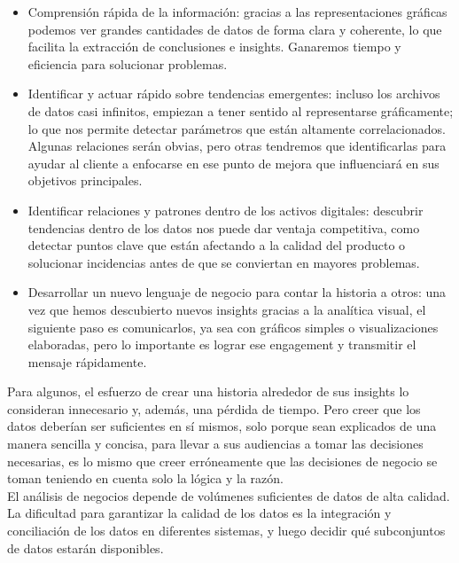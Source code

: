 \documentclass[preprint,12pt]{elsarticle}
\begin{document}
	\begin{itemize}
		\item Comprensión rápida de la información: gracias a las representaciones gráficas podemos ver grandes cantidades de datos de forma clara y coherente, lo que facilita la extracción de conclusiones e insights. Ganaremos tiempo y eficiencia para solucionar problemas.

		\item Identificar y actuar rápido sobre tendencias emergentes: incluso los archivos de datos casi infinitos, empiezan a tener sentido al representarse gráficamente; lo que nos permite detectar parámetros que están altamente correlacionados. Algunas relaciones serán obvias, pero otras tendremos que identificarlas para ayudar al cliente a enfocarse en ese punto de mejora que influenciará en sus objetivos principales.

		\item Identificar relaciones y patrones dentro de los activos digitales: descubrir tendencias dentro de los datos nos puede dar ventaja competitiva, como detectar puntos clave que están afectando a la calidad del producto o solucionar incidencias antes de que se conviertan en mayores problemas.

		\item Desarrollar un nuevo lenguaje de negocio para contar la historia a otros: una vez que hemos descubierto nuevos insights gracias a la analítica visual, el siguiente paso es comunicarlos, ya sea con gráficos simples o visualizaciones elaboradas, pero lo importante es lograr ese engagement y transmitir el mensaje rápidamente.	
	\end{itemize}
Para algunos, el esfuerzo de crear una historia alrededor de sus insights lo consideran innecesario y, además, una pérdida de tiempo. Pero creer que los datos deberían ser suficientes en sí mismos, solo porque sean explicados de una manera sencilla y concisa, para llevar a sus audiencias a tomar las decisiones necesarias, es lo mismo que creer erróneamente que las decisiones de negocio se toman teniendo en cuenta solo la lógica y la razón.\\


	
	El análisis de negocios depende de volúmenes suficientes de datos de alta calidad. La dificultad para garantizar la calidad de los datos es la integración y conciliación de los datos en diferentes sistemas, y luego decidir qué subconjuntos de datos estarán disponibles. \\
\end{document}

